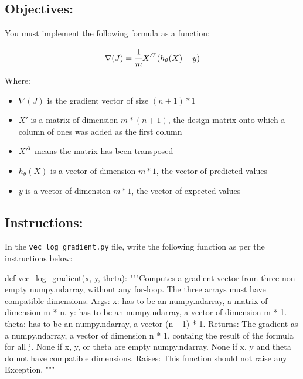 \documentclass[]{article}
\newenvironment{Shaded}{\begin{snugshade}}{\end{snugshade}}
\newcommand{\CommentTok}[1]{\textcolor[rgb]{0.48,0.49,0.49}{#1}}
\newcommand{\KeywordTok}[1]{\textcolor[rgb]{0.81,0.81,0.76}{#1}}
\newcommand{\NormalTok}[1]{\textcolor[rgb]{0.81,0.81,0.76}{#1}}
\begin{document}
\hypertarget{objectives-7}{%
\subsection{Objectives:}\label{objectives-7}}

You must implement the following formula as a function:

\large

\[
\nabla(J) = \cfrac{1}{m} X'^T(h_\theta(X) - y)
\] \normalsize

Where:

\begin{itemize}
\item
  \(\nabla(J)\) is the gradient vector of size \((n + 1) * 1\)
\item
  \(X'\) is a matrix of dimension \(m * (n + 1)\), the design matrix
  onto which a column of ones was added as the first column
\item
  \(X'^T\) means the matrix has been transposed
\item
  \(h_\theta(X)\) is a vector of dimension \(m * 1\), the vector of
  predicted values
\item
  \(y\) is a vector of dimension \(m * 1\), the vector of expected
  values
\end{itemize}

\hypertarget{instructions-7}{%
\subsection{Instructions:}\label{instructions-7}}

In the \texttt{vec\_log\_gradient.py} file, write the following function
as per the instructions below:

\begin{Shaded}
\begin{Highlighting}[]
\KeywordTok{def}\NormalTok{ vec_log_gradient(x, y, theta):}
    \CommentTok{"""Computes a gradient vector from three non-empty numpy.ndarray, without any for-loop. The three arrays must have compatible dimensions.}
\CommentTok{    Args:}
\CommentTok{      x: has to be an numpy.ndarray, a matrix of dimension m * n.}
\CommentTok{      y: has to be an numpy.ndarray, a vector of dimension m * 1.}
\CommentTok{      theta: has to be an numpy.ndarray, a vector (n +1) * 1.}
\CommentTok{    Returns:}
\CommentTok{      The gradient as a numpy.ndarray, a vector of dimension n * 1, containg the result of the formula for all j.}
\CommentTok{      None if x, y, or theta are empty numpy.ndarray.}
\CommentTok{      None if x, y and theta do not have compatible dimensions.}
\CommentTok{    Raises:}
\CommentTok{      This function should not raise any Exception.}
\CommentTok{    """}
\end{Highlighting}
\end{Shaded}
\end{document}
